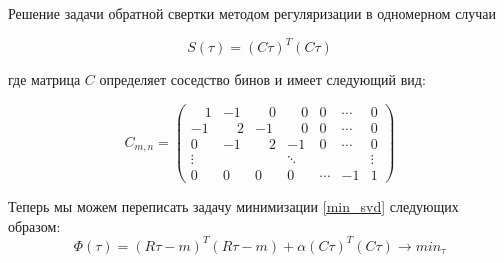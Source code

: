 \documentclass[fullscreen=true,russian,compress,%
	hyperref={unicode,bookmarks=false}]{presentation}
\begin{document}



\begin{frame}{Решение задачи обратной свертки методом регуляризации в одномерном случаи}

   \begin{equation}
      S(\tau) = (C\tau)^T(C\tau)
  \end{equation}
 
  где матрица $C$ определяет соседство бинов и имеет следующий вид:

   \begin{equation}
       C_{m,n} = 
    \begin{pmatrix}
      \quad 1 &       -1 &  \quad 0 &  \quad 0 & 0 & \cdots & 0 \\
           -1 &  \quad 2 &       -1 &  \quad 0 & 0 & \cdots & 0 \\
            0 &       -1 & \quad  2 &       -1 & 0 & \cdots & 0 \\
     \vdots &  & & \ddots & & & \vdots \\
     0  & 0  & 0 & 0 & \cdots & -1 & 1
    \end{pmatrix}
    \label{one_dim_neighbors_mat}
   \end{equation}

   Теперь мы можем переписать задачу минимизации \eqref{min_svd} следующих образом:
   \begin{equation}
      \Phi(\tau)=(R\tau-m)^T (R\tau-m) + \alpha(C\tau)^T(C\tau) \to min_{\tau}
      \label{min_one_dim}
   \end{equation}
\end{frame}
\end{document}
